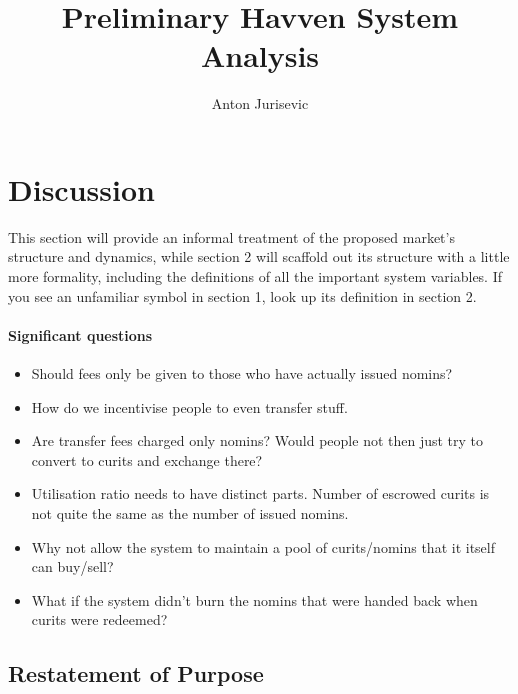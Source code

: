 \documentclass{article}
\begin{document}
\newcommand{\CUR}{\textsc{cur}}
\newcommand{\NOM}{\textsc{nom}}


\title{Preliminary Havven System Analysis}
\author{Anton Jurisevic}
\date{}

\begin{figure}
    \centering
    
\end{figure}
\maketitle

\section{Discussion}

This section will provide an informal treatment of the proposed market's structure
and dynamics, while section 2 will scaffold out its structure with a little more
formality, including the definitions of all the important system variables.
If you see an unfamiliar symbol in section 1, look up its definition in section 2.

\paragraph{Significant questions}
\begin{itemize}
    \item Should fees only be given to those who have actually issued nomins?
    \item How do we incentivise people to even transfer stuff.
    \item Are transfer fees charged only nomins? Would people not then just try to convert to curits and exchange there?
    \item Utilisation ratio needs to have distinct parts. Number of escrowed curits is not quite the same as the number of issued nomins.
    \item Why not allow the system to maintain a pool of curits/nomins that it itself can buy/sell?
    \item What if the system didn't burn the nomins that were handed back when curits were redeemed?
\end{itemize}

\pagebreak
\subsection{Restatement of Purpose}
\end{document}
